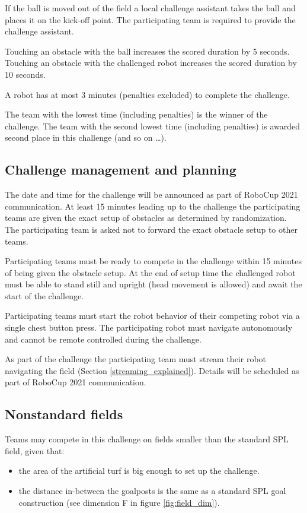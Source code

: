 If the ball is moved out of the field a local challenge assistant takes the ball and places it on the kick-off point. The participating team is required to provide the challenge assistant.

Touching an obstacle with the ball increases the scored duration by 5 seconds. Touching an obstacle with the challenged robot increases the scored duration by 10 seconds.

A robot has at most 3 minutes (penalties excluded) to complete the challenge.

The team with the lowest time (including penalties) is the winner of the challenge. The team with the second lowest time (including penalties) is awarded second place in this challenge (and so on \ldots).

\subsection{Challenge management and planning}

The date and time for the challenge will be announced as part of RoboCup 2021 communication. At least 15 minutes leading up to the challenge the participating teams are given the exact setup of obstacles as determined by randomization. The participating team is asked not to forward the exact obstacle setup to other teams.

Participating teams must be ready to compete in the challenge within 15 minutes of being given the obstacle setup. At the end of setup time the challenged robot must be able to stand still and upright (head movement is allowed) and await the start of the challenge.

Participating teams must start the robot behavior of their competing robot via a single chest button press. The participating robot must navigate autonomously and cannot be remote controlled during the challenge.

As part of the challenge the participating team must stream their robot navigating the field (\cf Section \ref{streaming_explained}). Details will be scheduled as part of RoboCup 2021 communication.

\subsection{Nonstandard fields}

Teams may compete in this challenge on fields smaller than the standard SPL field, given that:

\begin{itemize}
	\item the area of the artificial turf is big enough to set up the challenge.
	\item the distance in-between the goalposts is the same as a standard SPL goal construction (see dimension F in figure \ref{fig:field_dim}).
\end{itemize}

